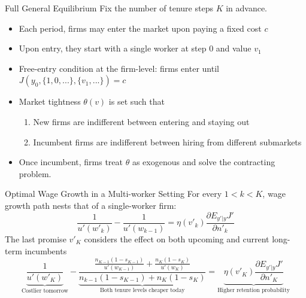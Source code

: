\documentclass[9pt,aspectratio=169]{beamer} %
\begin{document}
\begin{frame}[noframenumbering]{Full General Equilibrium}
\hypertarget{GE}{}
Fix the number of tenure steps $K$ in advance.
\vspace{5pt}
\begin{itemize}
    \item Each period, firms may enter the market upon paying a fixed cost $c$
    \item Upon entry, they start with a single worker at step $0$ and value $v_1$
    \item Free-entry condition at the firm-level: firms enter until $J(y_0,\{1,0,...\},\{v_1,...\})=c$
    \item Market tightness $\theta(v)$ is set such that 
    \begin{enumerate}
        \item New firms are indifferent between entering and staying out
        \item Incumbent firms are indifferent between hiring from different submarkets
    \end{enumerate}
    \item Once incumbent, firms treat $\theta$ as exogenous and solve the contracting problem. \hyperlink{PE}{}

\end{itemize}
\end{frame}

\begin{frame}[noframenumbering]{Optimal Wage Growth in a Multi-worker Setting}
 \hypertarget{Wage K}{}
For every $1<k<K$, wage growth path nests that of a single-worker firm:
\[\frac{1}{u'(w'_{k})}-\frac{1}{u'(w_{k-1})}=\eta(v'_{k})\frac{\partial E_{y'|y}J'}{\partial n'_{k}}\]
The last promise $v'_K$ considers the effect on both upcoming and current long-term incumbents
\[\underbrace{\frac{1}{u'(w'_{K})}}_{\text{Costlier tomorrow}}-\underbrace{\frac{\frac{n_{K-1}(1-s_{K-1})}{u'(w_{K-1})}+\frac{n_{K}(1-s_{K})}{u'(w_{K})}}{n_{k-1}(1-s_{K-1})+n_K(1-s_K)}}_{\text{Both tenure levels cheaper today}}=\underbrace{\eta(v'_{K})\frac{\partial E_{y'|y}J'}{\partial n'_{K}}}_{\text{Higher retention probability}}\]
\hyperlink{Wage}{}
\end{frame}
\end{document}
